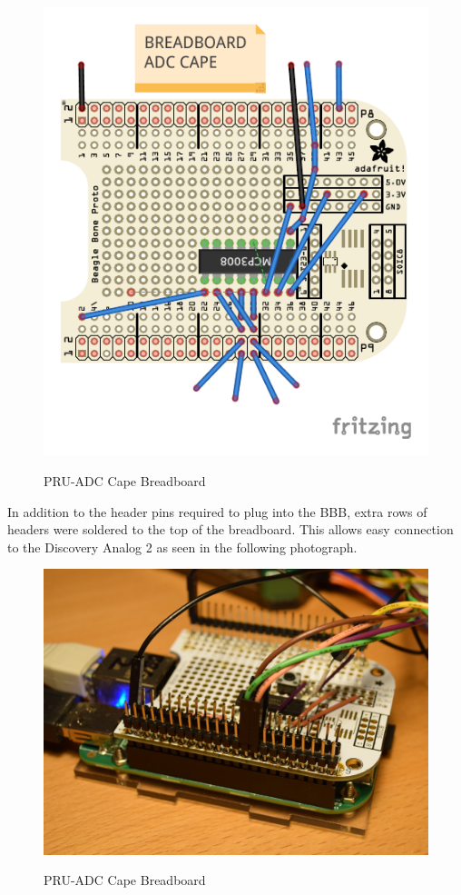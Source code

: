 \begin{figure}[h]
	\centering
	\includegraphics[]{../../pcb/adafruit_proto_cape_bb}
	\centering\bfseries
	\caption{PRU-ADC Cape Breadboard}
\end{figure}

In addition to the header pins required to plug into the BBB, extra rows of headers were soldered to the top of the breadboard.  This allows easy connection to the Discovery Analog 2 as seen in the following photograph.

\begin{figure}[h]
	\centering
	\includegraphics{photos/DSC_0025}
	\centering\bfseries
	\caption{PRU-ADC Cape Breadboard}
\end{figure}

